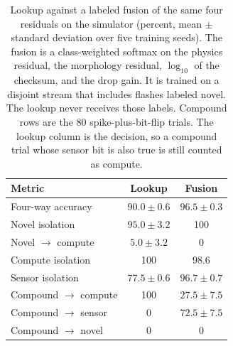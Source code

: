 \begin{table}[t]
\caption{Lookup against a labeled fusion of the same four residuals on the simulator (percent, mean $\pm$ standard deviation over five training seeds). The fusion is a class-weighted softmax on the physics residual, the morphology residual, $\log_{10}$ of the checksum, and the drop gain. It is trained on a disjoint stream that includes flashes labeled novel. The lookup never receives those labels. Compound rows are the 80 spike-plus-bit-flip trials. The lookup column is the decision, so a compound trial whose sensor bit is also true is still counted as compute.}
\label{tab:fusion}
\centering
\small
\begin{tabular}{lcc}
\toprule
Metric & Lookup & Fusion \\
\midrule
Four-way accuracy & $90.0 \pm 0.6$ & $96.5 \pm 0.3$ \\
Novel isolation & $95.0 \pm 3.2$ & 100 \\
Novel $\to$ compute & $5.0 \pm 3.2$ & 0 \\
Compute isolation & 100 & 98.6 \\
Sensor isolation & $77.5 \pm 0.6$ & $96.7 \pm 0.7$ \\
Compound $\to$ compute & 100 & $27.5 \pm 7.5$ \\
Compound $\to$ sensor & 0 & $72.5 \pm 7.5$ \\
Compound $\to$ novel & 0 & 0 \\
\bottomrule
\end{tabular}
\end{table}
